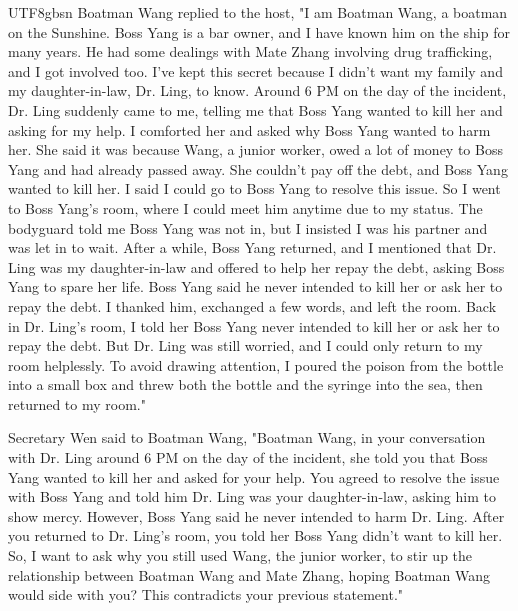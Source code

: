 \documentclass[11pt]{article}
\begin{document}
{\begin{CJK}{UTF8}{gbsn}
Boatman Wang replied to the host, "I am Boatman Wang, a boatman on the Sunshine. Boss Yang is a bar owner, and I have known him on the ship for many years. He had some dealings with Mate Zhang involving drug trafficking, and I got involved too. I've kept this secret because I didn't want my family and my daughter-in-law, Dr. Ling, to know. Around 6 PM on the day of the incident, Dr. Ling suddenly came to me, telling me that Boss Yang wanted to kill her and asking for my help. I comforted her and asked why Boss Yang wanted to harm her. She said it was because Wang, a junior worker, owed a lot of money to Boss Yang and had already passed away. She couldn't pay off the debt, and Boss Yang wanted to kill her. I said I could go to Boss Yang to resolve this issue. So I went to Boss Yang's room, where I could meet him anytime due to my status. The bodyguard told me Boss Yang was not in, but I insisted I was his partner and was let in to wait. After a while, Boss Yang returned, and I mentioned that Dr. Ling was my daughter-in-law and offered to help her repay the debt, asking Boss Yang to spare her life. Boss Yang said he never intended to kill her or ask her to repay the debt. I thanked him, exchanged a few words, and left the room. Back in Dr. Ling's room, I told her Boss Yang never intended to kill her or ask her to repay the debt. But Dr. Ling was still worried, and I could only return to my room helplessly. To avoid drawing attention, I poured the poison from the bottle into a small box and threw both the bottle and the syringe into the sea, then returned to my room."

Secretary Wen said to Boatman Wang, "Boatman Wang, in your conversation with Dr. Ling around 6 PM on the day of the incident, she told you that Boss Yang wanted to kill her and asked for your help. You agreed to resolve the issue with Boss Yang and told him Dr. Ling was your daughter-in-law, asking him to show mercy. However, Boss Yang said he never intended to harm Dr. Ling. After you returned to Dr. Ling's room, you told her Boss Yang didn't want to kill her. So, I want to ask why you still used Wang, the junior worker, to stir up the relationship between Boatman Wang and Mate Zhang, hoping Boatman Wang would side with you? This contradicts your previous statement."


\end{CJK}}
\end{document}
